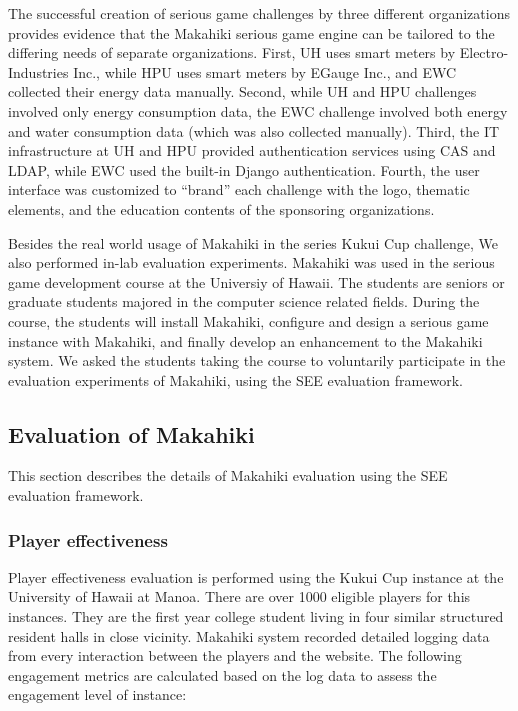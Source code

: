 \documentclass{sigchi}
\begin{document}
The successful creation of serious game challenges by three different organizations provides evidence that the Makahiki serious game engine can be tailored to the differing needs of separate organizations. First, UH uses smart meters by Electro-Industries Inc., while HPU uses smart meters by EGauge Inc., and EWC collected their energy data manually. Second, while UH and HPU challenges involved only energy consumption data, the EWC challenge involved both energy and water consumption data (which was also collected manually).  Third, the IT infrastructure at UH and HPU provided authentication services using CAS and LDAP, while EWC used the built-in Django authentication. Fourth, the user interface was customized to ``brand'' each challenge with the logo, thematic elements, and the education contents of the sponsoring organizations.

Besides the real world usage of Makahiki in the series Kukui Cup challenge, We also performed in-lab evaluation experiments. Makahiki was used in the serious game development course at the Universiy of Hawaii. The students are seniors or graduate students majored in the computer science related fields. During the course, the students will install Makahiki, configure and design a serious game instance with Makahiki, and finally develop an enhancement to the Makahiki system. We asked the students taking the course to voluntarily participate in the evaluation experiments of Makahiki, using the SEE evaluation framework.

\subsection{Evaluation of Makahiki}
This section describes the details of Makahiki evaluation using the SEE evaluation framework.

\subsubsection{Player effectiveness}
Player effectiveness evaluation is performed using the Kukui Cup instance at the University of Hawaii at Manoa. There are over 1000 eligible players for this instances. They are the first year college student living in four similar structured resident halls in close vicinity. Makahiki system recorded detailed logging data from every interaction between the players and the website. The following engagement metrics are calculated based on the log data to assess the engagement level of instance:
\end{document}
